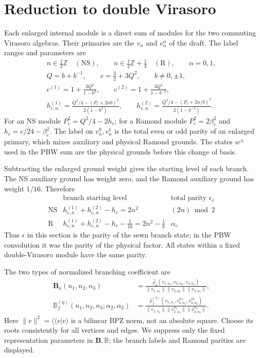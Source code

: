 \documentclass[11pt]{article}
\newcommand{\NS}{\mathrm{NS}}
\newcommand{\R}{\mathrm R}
\numberwithin{equation}{section}
\begin{document}
\section{Reduction to double Virasoro}

Each enlarged internal module is a direct sum of modules for the two
commuting Virasoro algebras. Their primaries are the $v_n$ and
$v_n^\alpha$ of the draft. The label ranges and parameters are
\begin{gather}
 n\in\tfrac12\mathbb Z\quad(\NS),\qquad
 n\in\tfrac12\mathbb Z+\tfrac14\quad(\R),\qquad
 \alpha=0,1,\nonumber\\
 Q=b+b^{-1},\qquad c=\tfrac32+3Q^2,\qquad b\ne0,\pm1,
 \nonumber\\
 c^{(1)}=1+\frac{3Q^2}{1-b^2},\qquad
 c^{(2)}=1+\frac{3Q^2}{1-b^{-2}},\nonumber\\
 h_{e,n}^{(1)}=\frac{Q^2/4-(P_e+2nb)^2}{2(1-b^2)},\qquad
 h_{e,n}^{(2)}=\frac{Q^2/4-(P_e+2n/b)^2}{2(1-b^{-2})}.
 \label{eq:weights}
\end{gather}
For an NS module $P_e^2=Q^2/4-2h_e$; for a Ramond module
$P_e^2=2\beta_e^2$ and $h_e=c/24-\beta_e^2$.
The label on $v_n^0,v_n^1$ is the total even or odd parity of an enlarged
primary, which mixes auxiliary and physical Ramond grounds. The states
$w^\pm$ used in the PBW sum are the physical grounds before this change
of basis.

Subtracting the enlarged ground weight gives the starting level of each
branch. The NS auxiliary ground has weight zero, and the Ramond auxiliary
ground has weight $1/16$. Therefore
\begin{equation}
 \begin{array}{c|c|c}
 &\text{branch starting level}&\text{total parity }\epsilon_e\\ \hline
 \NS& h_{e,n}^{(1)}+h_{e,n}^{(2)}-h_e=2n^2
                                      &(2n)\bmod2\\
 \R& h_{e,n}^{(1)}+h_{e,n}^{(2)}-h_e-\tfrac1{16}=2n^2-\tfrac18
                                      &\alpha_e
 \end{array}
 \label{eq:branches}
\end{equation}
Thus $\epsilon$ in this section is the parity of the sewn branch state;
in the PBW convolution it was the parity of the physical factor.
All states within a fixed double-Virasoro module have the same parity.

The two types of normalized branching coefficient are
\begin{align}
 \mathbf B_a(n_1,n_2,n_3)
 &=\frac{\hat\rho_a(v_{1,n_1},v_{2,n_2},v_{3,n_3})}
         {\|v_{1,n_1}\|\|v_{2,n_2}\|\|v_{3,n_3}\|},\nonumber\\
 \mathbb B_f^{(\eta)}(n_1,n_2,n_3;\alpha_2,\alpha_3)
 &=\frac{\hat\rho_f^{(\eta)}
             (v_{1,n_1},v_{2,n_2}^{\alpha_2},v_{3,n_3}^{\alpha_3})}
         {\|v_{1,n_1}\|\|v_{2,n_2}^{\alpha_2}\|\|v_{3,n_3}^{\alpha_3}\|}.
 \label{eq:branching-definitions}
\end{align}
Here $\|v\|^2=\langle\!\langle v|v\rangle$ is a bilinear BPZ norm,
not an absolute square. Choose its roots consistently for all vertices
and edges. We suppress only the fixed representation parameters in
$\mathbf B,\mathbb B$; the branch labels and Ramond parities are displayed.
\end{document}
